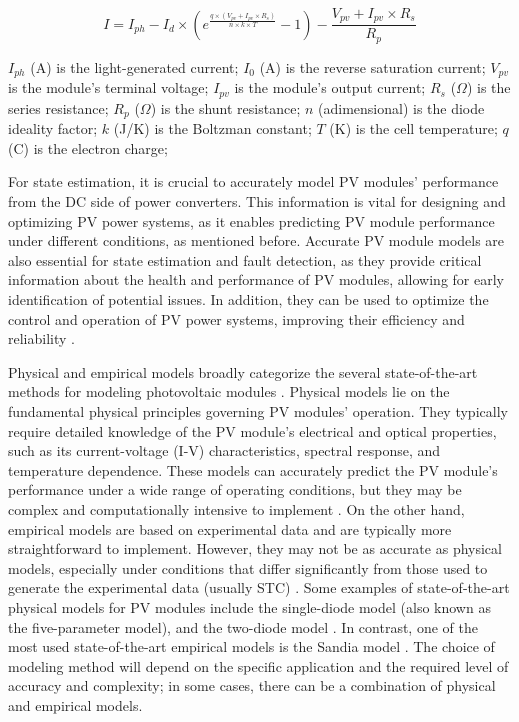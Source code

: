 \begin{equation} \label{eq:iv}
    I = I_{ph} - I_d \times (e^{\frac{q \times (V_{pv} + I_{pv} \times R_{s})}{n \times k \times T}} - 1) - \frac{V_{pv} + I_{pv} \times R_s}{R_p}
\end{equation}

$I_{ph}$ (A) is the light-generated current;
$I_{0}$ (A) is the reverse saturation current;
$V_{pv}$ is the module's terminal voltage;
$I_{pv}$ is the module's output current;
$R_{s}$ ($\Omega$) is the series resistance;
$R_{p}$ ($\Omega$) is the shunt resistance;
$n$ (adimensional) is the diode ideality factor;
$k$ (J/K) is the Boltzman constant;
$T$ (K) is the cell temperature;
$q$ (C) is the electron charge;

For state estimation, it is crucial to accurately model PV modules' performance from the DC side of power converters. This information is vital for designing and optimizing PV power systems, as it enables predicting PV module performance under different conditions, as mentioned before. Accurate PV module models are also essential for state estimation and fault detection, as they provide critical information about the health and performance of PV modules, allowing for early identification of potential issues. In addition, they can be used to optimize the control and operation of PV power systems, improving their efficiency and reliability \cite{Braun2011}.

Physical and empirical models broadly categorize the several state-of-the-art methods for modeling photovoltaic modules \cite{Braun2011}. Physical models lie on the fundamental physical principles governing PV modules' operation. They typically require detailed knowledge of the PV module's electrical and optical properties, such as its current-voltage (I-V) characteristics, spectral response, and temperature dependence. These models can accurately predict the PV module's performance under a wide range of operating conditions, but they may be complex and computationally intensive to implement \cite{Kumar2019}. On the other hand, empirical models are based on experimental data and are typically more straightforward to implement. However, they may not be as accurate as physical models, especially under conditions that differ significantly from those used to generate the experimental data (usually STC) \cite{Braun2011}. Some examples of state-of-the-art physical models for PV modules include the single-diode model (also known as the five-parameter model), and the two-diode model \cite{Godina2017}. In contrast, one of the most used state-of-the-art empirical models is the Sandia model \cite{Braun2011}. The choice of modeling method will depend on the specific application and the required level of accuracy and complexity; in some cases, there can be a combination of physical and empirical models.

